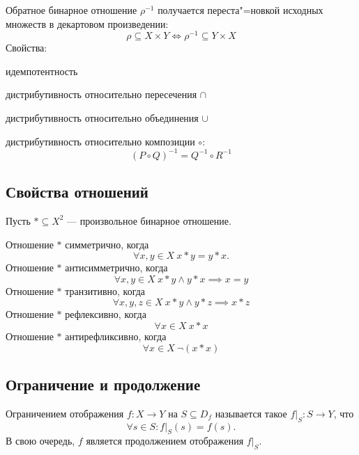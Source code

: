 \begin{theorem}
{\bold Обратное} бинарное отношение $\rho^{-1}$ получается переста"=новкой исходных множеств в декартовом произведении:
$$\rho\subseteq X\times Y\iff\rho^{-1}\subseteq Y\times X$$
Свойства:
\begin{list*}
\item идемпотентность
\item дистрибутивность относительно {\ital пересечения} $\cap$
\item дистрибутивность относительно {\ital объединения} $\cup$
\item дистрибутивность относительно {\ital композиции} $\circ$:
$$(P\circ Q)^{-1}=Q^{-1}\circ R^{-1}$$
\end{list*}
\end{theorem}

\subsection{Свойства отношений}

Пусть $\ast\subseteq X^2$ --- произвольное бинарное отношение.

Отношение $\ast$ {\ital симметрично}, когда
$$\forall x,y\in X\ x\ast y=y\ast x.$$
Отношение $\ast$ {\ital антисимметрично}, когда
$$\forall x,y\in X\ x\ast y\land y\ast x\implies x=y$$
Отношение $\ast$ {\ital транзитивно}, когда
$$\forall x,y,z\in X\ x\ast y\land y\ast z\implies x\ast z$$
Отношение $\ast$ {\ital рефлексивно}, когда
$$\forall x\in X\ x\ast x$$
Отношение $\ast$ {\ital антирефликсивно}, когда
$$\forall x\in X\ \lnot (x\ast x)$$

\subsection{Ограничение и продолжение}

{\ital Ограничением} отображения $f\colon X\to Y$ на $S\subseteq D_f$ называется
такое $f\vert_S\colon S\to Y$, что
$$\forall s\in S\colon f\vert_S(s)=f(s).$$
В свою очередь, $f$ является {\ital продолжением} отображения $f\vert_S$.\par
